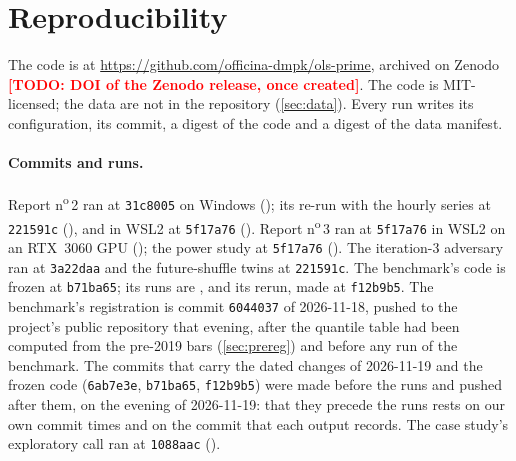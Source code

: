 \documentclass[11pt]{article}
\DeclareRobustCommand{\todo}[1]{\textcolor{red}{\textbf{[TODO: #1]}}}
\newcommand{\code}[1]{\texttt{#1}}
\begin{document}
\section{Reproducibility}\label{sec:repro}
The code is at \url{https://github.com/officina-dmpk/ols-prime}, archived on Zenodo
\todo{DOI of the Zenodo release, once created}. The code is MIT-licensed; the data are not in
the repository (\cref{sec:data}). Every run writes its configuration, its commit, a digest of the
code and a digest of the data manifest.

\paragraph{Commits and runs.} Report n\textsuperscript{o}\,2 ran at \code{31c8005} on Windows
(); its re-run with the hourly series at \code{221591c}
(), and in WSL2 at \code{5f17a76} ().
Report n\textsuperscript{o}\,3 ran at \code{5f17a76} in WSL2 on an RTX~3060 GPU
(); the power study at \code{5f17a76} ().
The iteration-3 adversary ran at \code{3a22daa} and the future-shuffle twins at \code{221591c}. The
benchmark's code is frozen at \code{b71ba65}; its runs are ,
 and its rerun, made at \code{f12b9b5}.
The benchmark's registration is commit \code{6044037} of 2026-11-18, pushed to the project's public
repository that evening, after the quantile table had been computed from the pre-2019 bars
(\cref{sec:prereg}) and before any run of the benchmark. The commits that carry the dated changes
of 2026-11-19 and the frozen code (\code{6ab7e3e}, \code{b71ba65}, \code{f12b9b5}) were made before
the runs and pushed after them, on the evening of 2026-11-19: that they precede the runs rests on
our own commit times and on the commit that each output records. The case
study's exploratory call ran at \code{1088aac} ().
\end{document}
